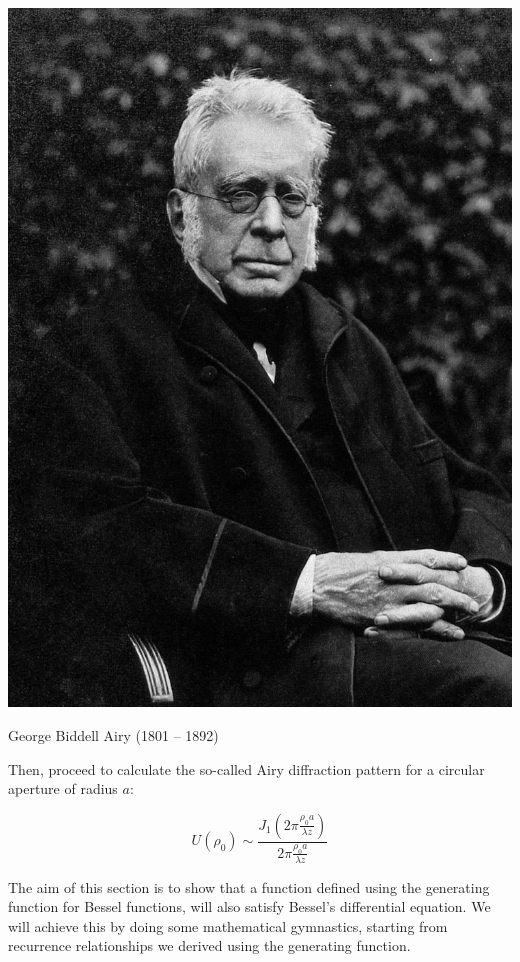 \begin{exer}
\begin{marginfigure}[-5cm]
  \includegraphics{bessel/figures/g_airy}
  \caption{George Biddell Airy (1801 – 1892)}
\end{marginfigure}

Then, proceed to calculate the so-called Airy diffraction pattern for a circular aperture of radius $a$:

$$U(\rho_0) \sim \frac {J_1\left( 2 \pi \frac {\rho_0 a}{\lambda z} \right)}{ 2 \pi \frac{\rho_0 a}{\lambda z}}$$

\end{exer}

\pagebreak


The aim of this section is to show that a function defined using the generating function for Bessel functions, will also satisfy Bessel's differential equation. We will achieve this by doing some mathematical gymnastics, starting from recurrence relationships we derived using the generating function.

